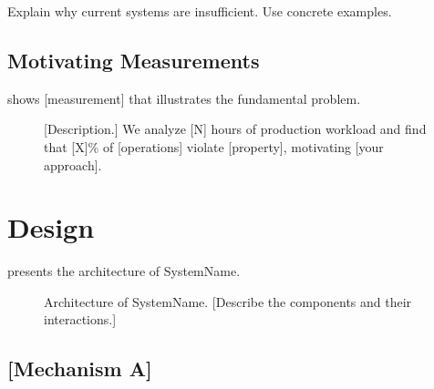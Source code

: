 \documentclass[sigplan,10pt]{acmart}
\newcommand{\system}{SystemName\xspace}
\begin{document}
Explain why current systems are insufficient. Use concrete examples.

\subsection{Motivating Measurements}

 shows [measurement] that illustrates the
fundamental problem.

\begin{figure}[t]
  \centering
  \caption{[Description.] We analyze [N] hours of production workload
    and find that [X]\% of [operations] violate [property],
    motivating [your approach].}
  \label{fig:motivation}
\end{figure}

\section{Design}
\label{sec:design}


 presents the architecture of \system.

\begin{figure}[t]
  \centering
  \caption{Architecture of \system. [Describe the components
    and their interactions.]}
  \label{fig:architecture}
\end{figure}

\subsection{[Mechanism A]}
\label{sec:design:a}
\end{document}
